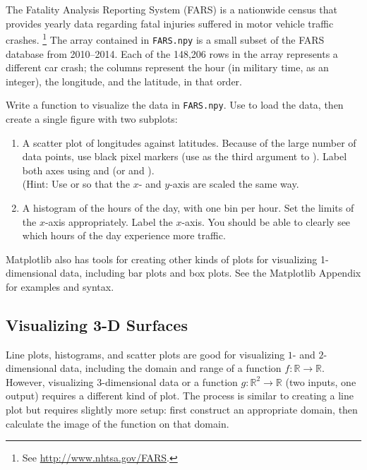 \begin{problem} %
The Fatality Analysis Reporting System (FARS) is a nationwide census that provides yearly data regarding fatal injuries suffered in motor vehicle traffic crashes.%
\footnote{See \url{http://www.nhtsa.gov/FARS}.}
The array contained in \texttt{FARS.npy} is a small subset of the FARS database from 2010--2014.
Each of the 148,206 rows in the array represents a different car crash; the columns represent the hour (in military time, as an integer), the longitude, and the latitude, in that order.

Write a function to visualize the data in \texttt{FARS.npy}.
Use  to load the data, then create a single figure with two subplots:
%
\begin{enumerate}
\item A scatter plot of longitudes against latitudes.
Because of the large number of data points, use black pixel markers (use  as the third argument to ).
Label both axes using  and  (or  and ).
\\
(Hint: Use  or  so that the $x$- and $y$-axis are scaled the same way.

\item A histogram of the hours of the day, with one bin per hour.
Set the limits of the $x$-axis appropriately.
Label the $x$-axis.
You should be able to clearly see which hours of the day experience more traffic.
\end{enumerate}
\end{problem}

Matplotlib also has tools for creating other kinds of plots for visualizing 1-dimensional data, including bar plots and box plots.
See the Matplotlib Appendix for examples and syntax.

\subsection*{Visualizing 3-D Surfaces} %

Line plots, histograms, and scatter plots are good for visualizing $1$- and $2$-dimensional data, including the domain and range of a function $f:\mathbb{R}\rightarrow\mathbb{R}$.
However, visualizing $3$-dimensional data or a function $g:\mathbb{R}^2\rightarrow\mathbb{R}$ (two inputs, one output) requires a different kind of plot.
The process is similar to creating a line plot but requires slightly more setup: first construct an appropriate domain, then calculate the image of the function on that domain.

